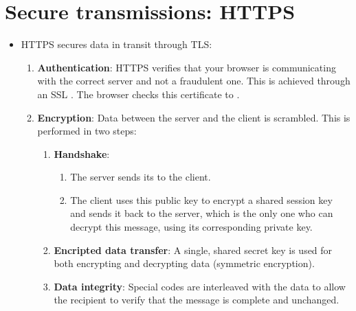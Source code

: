 \section{Secure transmissions: \gls{HTTPS}}
\begin{itemize}
\item \gls{HTTPS} secures data in transit through \gls{TLS}:
  \begin{enumerate}
  \item \textbf{Authentication}: HTTPS verifies that your browser is
    communicating with the correct server and not a fraudulent
    one. This is achieved through an \gls{SSL}
    . The browser checks this
    certificate to .
  \item \textbf{Encryption}: Data between the server and the client is
    scrambled. This is performed in two steps:
    \begin{enumerate}
    \item \textbf{Handshake}:
      \begin{enumerate}
      \item The server sends its  to the client.
      \item The client uses this public key to encrypt a shared
        session key and sends it back to the server, which is the only
        one who can decrypt this message, using its corresponding
        private key.
      \end{enumerate}
    \item \textbf{Encripted data transfer}: A single, shared secret
      key is used for both encrypting and decrypting data (symmetric
      encryption).
    \item \textbf{Data integrity}: Special codes are interleaved with
      the data to allow the recipient to verify that the message is
      complete and unchanged.
    \end{enumerate}
  \end{enumerate}
\end{itemize}

